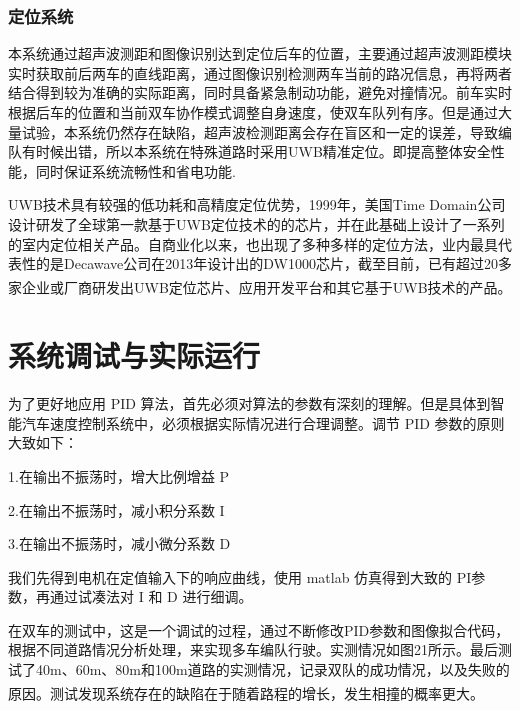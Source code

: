 \documentclass{article}%
\begin{document}
\begin{multicols}{2}
		\subsubsection{定位系统}
		本系统通过超声波测距和图像识别达到定位后车的位置，主要通过超声波测距模块实时获取前后两车的直线距离，通过图像识别检测两车当前的路况信息，再将两者结合得到较为准确的实际距离，同时具备紧急制动功能，避免对撞情况。前车实时根据后车的位置和当前双车协作模式调整自身速度，使双车队列有序。但是通过大量试验，本系统仍然存在缺陷，超声波检测距离会存在盲区和一定的误差，导致编队有时候出错，所以本系统在特殊道路时采用UWB精准定位。即提高整体安全性能，同时保证系统流畅性和省电功能.
		
		UWB技术具有较强的低功耗和高精度定位优势，1999年，美国Time Domain公司设计研发了全球第一款基于UWB定位技术的的芯片，并在此基础上设计了一系列的室内定位相关产品。自商业化以来，也出现了多种多样的定位方法，业内最具代表性的是Decawave公司在2013年设计出的DW1000芯片，截至目前，已有超过20多家企业或厂商研发出UWB定位芯片、应用开发平台和其它基于UWB技术的产品\textsuperscript{\cite{ref9}}。
		
		\section{系统调试与实际运行}
		
		为了更好地应用 PID 算法，首先必须对算法的参数有深刻的理解。但是具体到智能汽车速度控制系统中，必须根据实际情况进行合理调整。调节 PID 参数的原则大致如下：
				
		1.在输出不振荡时，增大比例增益 P
		
		2.在输出不振荡时，减小积分系数 I
	
		3.在输出不振荡时，减小微分系数 D
		
		我们先得到电机在定值输入下的响应曲线，使用 matlab 仿真得到大致的 PI参数，再通过试凑法对 I 和 D 进行细调。 
		
		在双车的测试中，这是一个调试的过程，通过不断修改PID参数和图像拟合代码，根据不同道路情况分析处理，来实现多车编队行驶。实测情况如图21所示。最后测试了40m、60m、80m和100m道路的实测情况，记录双队的成功情况，以及失败的原因。测试发现系统存在的缺陷在于随着路程的增长，发生相撞的概率更大\textsuperscript{\cite{ref10}}。
		

\end{multicols}
\end{document}
